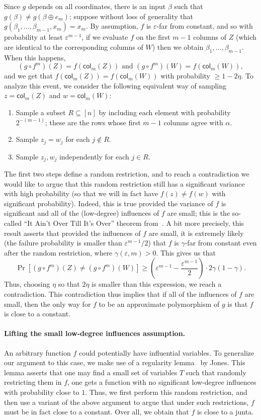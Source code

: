 \documentclass{article}
\theoremstyle{definition}
\theoremstyle{remark}
\providecommand{\col}{\mathsf{col}}
\newcommand\eps{\varepsilon}
\renewcommand\epsilon{\eps}
\renewcommand\geq{\geqslant}
\begin{document}
Since $g$ depends on all coordinates, there is an input $\beta$ such that $g(\beta) \neq g(\beta\oplus e_m)$; suppose without loss of generality that $g(\beta_1,\ldots,\beta_{m-1},x_m) = x_m$. 
By assumption, $f$ is $\epsilon$-far from constant, and so with probability at least $\epsilon^{m-1}$, if we evaluate $f$ on the first $m-1$ columns of $Z$ (which are identical to the corresponding columns of $W$) then we obtain $\beta_1,\ldots,\beta_{m-1}$. When this happens,
\[
 (g \circ f^{m})(Z) = f(\col_m(Z)) \text{ and } 
 (g \circ f^{m})(W) = f(\col_m(W)),
\]
and we get that $f(\col_m(Z)) = f(\col_m(W))$ with probability $\geq 1-2\eta$.
To analyze this event, we consider the following equivalent way of sampling $z = \col_m(Z)$ and $w = \col_m(W)$:
\begin{enumerate}
    \item Sample a subset $R \subseteq [n]$ by including each element with probability $2^{-(m-1)}$; these are the rows whose first $m-1$ columns agree with $\alpha$.
    \item Sample $z_j = w_j$ for each $j \notin R$.
    \item Sample $z_j,w_j$ independently for each $j \in R$.
\end{enumerate}

The first two steps define a random restriction, and to reach a contradiction we would like to argue that this random restriction still has a significant variance with high probability (so that we will in fact have $f(z)\neq f(w)$ with significant probability). Indeed, this is true provided the variance of $f$ is significant and all of the (low-degree) influences of $f$ are small; this is the so-called ``It Ain't Over Till It's Over'' theorem from~\cite{MOO}. A bit more precisely, this result
asserts that provided the influences of $f$ are small, it is extremely likely (the failure probability is smaller than $\epsilon^{m-1}/2$) that $f$ is $\gamma$-far from constant even after the random restriction, where $\gamma(\eps,m)>0$. This gives us
that
\[
 \Pr[(g \circ f^m)(Z) \neq (g \circ f^m)(W)] \geq \left(\epsilon^{m-1} - \frac{\epsilon^{m-1}}{2}\right) \cdot 2\gamma(1-\gamma).
\]
Thus, choosing $\eta$ so that $2\eta$ is smaller than this expression, we reach a contradiction. This contradiction thus implies that if all of the influences of $f$ 
are small, then the only way for $f$ to be an approximate polymorphism of $g$ is that
$f$ is close to a constant.


\paragraph{Lifting the small low-degree influences assumption.} An arbitrary function $f$ could potentially have influential variables. To generalize our argument to this 
case, we make use of a regularity lemma~\cite{Jones} by Jones. This lemma asserts that one may find a small set of variables $T$ such that randomly restricting them in
$f$, one gets a function with no significant low-degree influences with probability 
close to $1$. Thus, we first perform this random restriction, and then use a variant of the above argument to argue that under such restrictions, $f$ must be in fact 
close to a constant. Over all, we obtain that $f$ is close to a junta.
\end{document}

